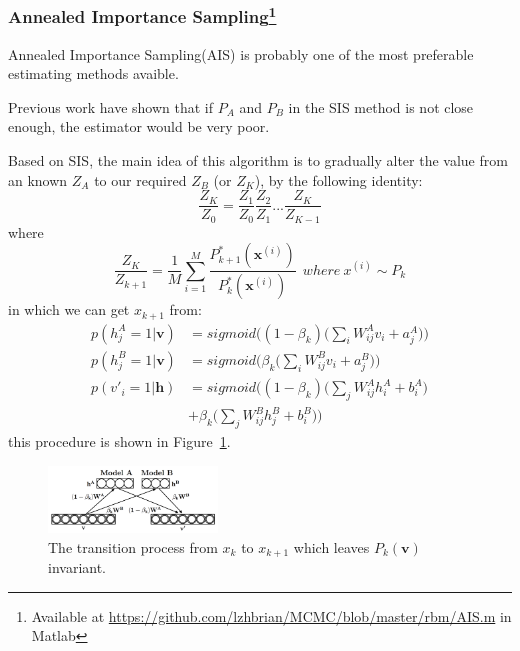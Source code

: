 
\subsubsection{Annealed Importance Sampling\protect\footnote{Available at \protect\url{https://github.com/lzhbrian/MCMC/blob/master/rbm/AIS.m} in Matlab}}

Annealed Importance Sampling(AIS)\cite{neal2001annealed,salakhutdinov2009learning} is probably one of the most preferable estimating methods avaible.

Previous work \cite{mackay2003information} have shown that if $P_{A}$ and $P_{B}$ in the SIS method is not close enough, the estimator would be very poor.

Based on SIS, the main idea of this algorithm is to gradually alter the value from an known $Z_{A}$ to our required $Z_{B}$ (or $Z_{K}$), by the following identity:
\begin{equation}
\frac{Z_{K}}{Z_{0}} = \frac{Z_{1}}{Z_{0}} \frac{Z_{2}}{Z_{1}} ... \frac{Z_{K}}{Z_{K-1}}
\end{equation}
where 
\begin{equation}
\frac{Z_{K}}{Z_{k+1}} = \frac{1}{M} \sum_{i=1}^{M} \frac{P_{k+1}^{*}(\mathbf x^{(i)})}{P_{k}^{*}(\mathbf x^{(i)})}
~~where~ x^{(i)} \sim P_{k}
\end{equation}
in which we can get $x_{k+1}$ from:
\begin{equation}
\begin{aligned}
p(h^{A}_{j}=1|\mathbf v) &= sigmoid\Bigg( (1-\beta_{k})\Bigg(\sum_{i}W^{A}_{ij}v_{i}+a^{A}_{j}\Bigg) \Bigg) \\
p(h^{B}_{j}=1|\mathbf v) &= sigmoid\Bigg( \beta_{k}\Bigg(\sum_{i}W^{B}_{ij}v_{i}+a^{B}_{j}\Bigg) \Bigg) \\ 
p(v'_{i}=1|\mathbf h) &= sigmoid\Bigg( (1-\beta_{k})\Bigg(\sum_{j}W^{A}_{ij}h_{i}^{A}+b^{A}_{i}\Bigg) \\
& + \beta_{k}\Bigg(\sum_{j}W^{B}_{ij}h_{j}^{B}+b^{B}_{i}\Bigg) \Bigg) 
\end{aligned}
\end{equation}
this procedure is shown in Figure~\ref{fig:xkxk1}.

\begin{figure}[tb]
  	\centering
  	\includegraphics[width=0.4\textwidth]{figure/xkxk1.png}
	\caption{The transition process from $x_{k}$ to $x_{k+1}$ which leaves $P_{k}(\mathbf v)$ invariant.}
	\label{fig:xkxk1}
\end{figure}

